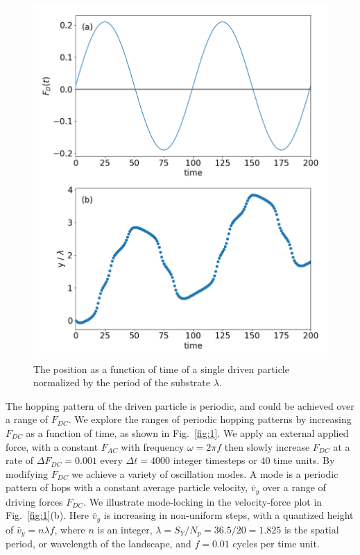 \documentclass[twocolumn,preprintnumbers,amsmath,amssymb,aps,prx]{revtex4}
\begin{document}
\begin{center}
\begin{figure}[h!]
\centering
\includegraphics[width=\columnwidth]{position}
\caption{The position as a function of time of a single driven particle
  normalized by the period of the substrate $\lambda$.
  }
\label{fig:0}
\end{figure}
\end{center}

The hopping pattern of the driven particle is periodic,
and could be achieved over a range of $F_{DC}$.  %
We explore the ranges of periodic hopping patterns
by increasing $F_{DC}$ as a function of time,
as shown in 
%
Fig.~\ref{fig:1}.
We apply an external applied force, 
with 
a constant $F_{AC}$ with frequency $\omega = 2\pi f$
then slowly increase $F_{DC}$
at a rate of $\Delta F_{DC} = 0.001$ every $\Delta t = 4000$ integer timesteps
or $40$ time units.
By modifying $F_{DC}$ we 
achieve a variety of oscillation modes.
A mode is a periodic pattern of hops
with a constant average particle velocity, $\bar{v}_{y}$
over a range of driving forces $F_{DC}$.
We illustrate mode-locking in 
the velocity-force plot in Fig.~\ref{fig:1}(b).
Here $\bar{v}_{y}$ is increasing in non-uniform steps,
with a quantized height of
$\bar{v}_{y} = n \lambda f$,
where $n$ is an integer,
$\lambda = S_Y/N_p = 36.5/20 = 1.825$ is the spatial period, or wavelength
of the landscape,
and $f = 0.01$ cycles per time unit.
\end{document}
